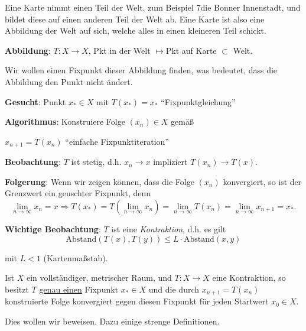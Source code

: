 \documentclass[a4paper,10pt]{article}
\begin{document}
    \def\svgwidth{\columnwidth}
    

\def\svgwidth{\columnwidth}
    


Eine Karte nimmt einen Teil der Welt, zum Beispiel 7die Bonner Innenstadt,
und bildet diese auf einen anderen Teil der Welt ab. Eine Karte ist also eine
Abbildung der Welt auf sich, welche alles in einen kleineren Teil schickt.

\vspace{.5cm}

{\textbf{Abbildung}}:  $T: X \to X$,  
			          Pkt in der Welt $ \mapsto $Pkt auf Karte
			       $\subset $ Welt.

\vspace{.5cm}		       
Wir wollen einen Fixpunkt dieser Abbildung finden, was bedeutet, dass die Abbildung 
den Punkt nicht ändert.

\vspace{.5cm}		       
 {\textbf{Gesucht}}: Punkt  $x_* \in X$  mit
 $\boxed{T(x_*) = x_*}$ ``Fixpunktgleichung''
\vspace{.5cm}		       
 

 {\textbf{Algorithmus}}: Konstruiere Folge  $(x_n) \in X$  gemäß 
  
    \hspace{2cm} $\boxed{x_{n+1} = T(x_n)}$ ``einfache Fixpunktiteration''
\vspace{.5cm}		       


{\textbf{Beobachtung}}: $T$ ist stetig, d.h. $x_n \to x$ impliziert $T(x_n) \to T(x)$.

\vspace{.5cm}		       

{\textbf{Folgerung}}: Wenn wir zeigen können, dass die Folge $(x_n)$ konvergiert,
so ist der Grenzwert ein geuschter Fixpunkt, denn
\[
 \lim_{n \to \infty} x_n = x \Rightarrow T(x_*) = T(\lim_{n \to \infty} x_n) =
 \lim_{n \to \infty} T(x_n) = \lim_{n \to \infty} x_{n+1} = x_*.
\]


\textbf{Wichtige Beobachtung}: $T$ ist eine \textit{Kontraktion}, d.h. es gilt
\[
 \text{Abstand}(T(x), T(y)) \leq L \cdot \text{Abstand}(x, y)
\]

mit $L < 1$ (Kartenmaßstab).


\begin{thrm*}

Ist $X$ ein vollständiger, metrischer Raum, und $T: X\to X$ eine Kontraktion, so besitzt $T$
\underline{genau einen} Fixpunkt $x_* \in X$ und die durch $x_{n+1} = T(x_n)$ konstruierte Folge
konvergiert gegen diesen Fixpunkt für jeden Startwert $x_0 \in X$.
\end{thrm*}
Dies wollen wir beweisen. Dazu einige strenge Definitionen.
\end{document}
